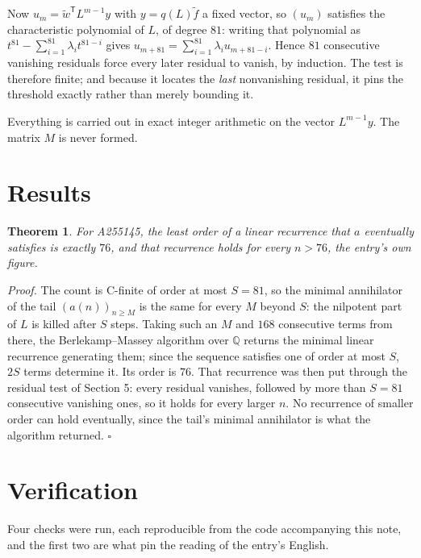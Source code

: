 \documentclass[11pt]{article}
\newtheorem{theorem}{Theorem}
\theoremstyle{definition}
\begin{document}
Now $u_m = \tilde w^{\mathsf T} L^{m-1} y$ with $y = q(L)\tilde f$ a fixed vector, so $(u_m)$ satisfies the characteristic polynomial of $L$, of degree $81$: writing that polynomial as $t^{81} - \sum_{i=1}^{81} \lambda_i t^{81-i}$ gives $u_{m+81} = \sum_{i=1}^{81} \lambda_i u_{m+81-i}$. Hence $81$ consecutive vanishing residuals force every later residual to vanish, by induction. The test is therefore finite; and because it locates the {\itshape last} nonvanishing residual, it pins the threshold exactly rather than merely bounding it.

Everything is carried out in exact integer arithmetic on the vector $L^{m-1}y$. The matrix $M$ is never formed.

\section{Results}

\begin{theorem} For A255145, the least order of a linear recurrence that $a$ eventually satisfies is exactly $76$, and that recurrence holds for every $n > 76$, the entry's own figure.\end{theorem}

{\itshape Proof.} The count is C-finite of order at most $S = 81$, so the minimal annihilator of the tail $(a(n))_{n \ge M}$ is the same for every $M$ beyond $S$: the nilpotent part of $L$ is killed after $S$ steps. Taking such an $M$ and $168$ consecutive terms from there, the Berlekamp--Massey algorithm over $\mathbb{Q}$ returns the minimal linear recurrence generating them; since the sequence satisfies one of order at most $S$, $2S$ terms determine it. Its order is $76$. That recurrence was then put through the residual test of Section 5: every residual vanishes, followed by more than $S = 81$ consecutive vanishing ones, so it holds for every larger $n$. No recurrence of smaller order can hold eventually, since the tail's minimal annihilator is what the algorithm returned. $\square$

\section{Verification}

Four checks were run, each reproducible from the code accompanying this note, and the first two are what pin the reading of the entry's English.
\end{document}
